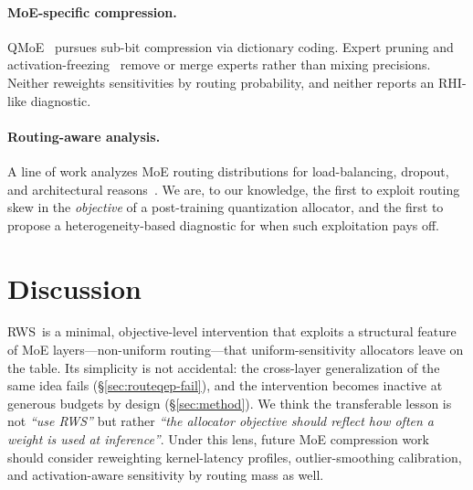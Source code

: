 \documentclass{article}
\newcommand{\method}{\textsc{RWS}\xspace}
\newcommand{\rhi}{\mathrm{RHI}}
\begin{document}
\paragraph{MoE-specific compression.} QMoE~\citep{ding2024qmoe} pursues sub-bit compression via dictionary coding. Expert pruning and activation-freezing~\citep{eacmoe2024} remove or merge experts rather than mixing precisions. Neither reweights sensitivities by routing probability, and neither reports an $\rhi$-like diagnostic.

\paragraph{Routing-aware analysis.} A line of work analyzes MoE routing distributions for load-balancing, dropout, and architectural reasons~\citep{fedus2022switch, shazeer2017outrageously}. We are, to our knowledge, the first to exploit routing skew in the \emph{objective} of a post-training quantization allocator, and the first to propose a heterogeneity-based diagnostic for when such exploitation pays off.

\section{Discussion}
\label{sec:discussion}

\method\ is a minimal, objective-level intervention that exploits a structural feature of MoE layers---non-uniform routing---that uniform-sensitivity allocators leave on the table. Its simplicity is not accidental: the cross-layer generalization of the same idea fails (\S\ref{sec:routeqep-fail}), and the intervention becomes inactive at generous budgets by design (\S\ref{sec:method}). We think the transferable lesson is not \emph{``use RWS''} but rather \emph{``the allocator objective should reflect how often a weight is used at inference''}. Under this lens, future MoE compression work should consider reweighting kernel-latency profiles, outlier-smoothing calibration, and activation-aware sensitivity by routing mass as well.
\end{document}
